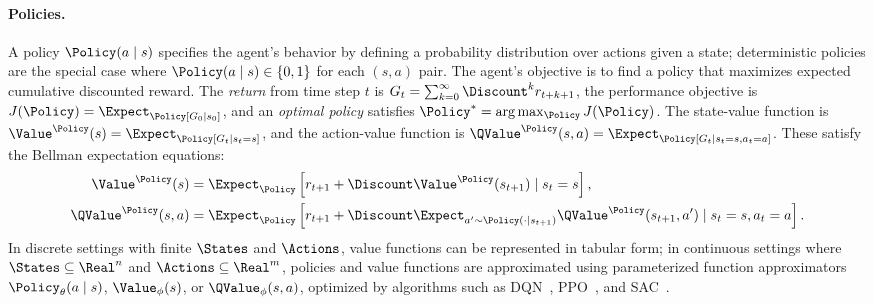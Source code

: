 \paragraph{Policies.}
A policy $\Policy(a \mid s)$ specifies the agent's behavior by defining a probability distribution over actions given a state; deterministic policies are the special case where $\Policy(a \mid s) \in \{0, 1\}$ for each $(s, a)$ pair. The agent's objective is to find a policy that maximizes expected cumulative discounted reward. The \emph{return} from time step $t$ is $G_t = \sum_{k=0}^{\infty} \Discount^k r_{t+k+1}$, the performance objective is $J(\Policy) = \Expect_\Policy[G_0 \mid s_0]$, and an \emph{optimal policy} satisfies $\Policy^* = \arg\max_\Policy J(\Policy)$. The state-value function is $\Value^\Policy(s) = \Expect_\Policy[G_t \mid s_t = s]$, and the action-value function is $\QValue^\Policy(s,a) = \Expect_\Policy[G_t \mid s_t = s, a_t = a]$. These satisfy the Bellman expectation equations:
\begin{align}
\Value^\Policy(s) &= \Expect_\Policy\left[r_{t+1} + \Discount \Value^\Policy(s_{t+1}) \mid s_t = s\right], \\
\QValue^\Policy(s,a) &= \Expect_\Policy\left[r_{t+1} + \Discount \Expect_{a' \sim \Policy(\cdot \mid s_{t+1})} \QValue^\Policy(s_{t+1}, a') \mid s_t = s, a_t = a\right].
\end{align}
In discrete settings with finite $\States$ and $\Actions$, value functions can be represented in tabular form; in continuous settings where $\States \subseteq \Real^n$ and $\Actions \subseteq \Real^m$, policies and value functions are approximated using parameterized function approximators $\Policy_\theta(a \mid s)$, $\Value_\phi(s)$, or $\QValue_\phi(s, a)$, optimized by algorithms such as DQN~\citep{mnih2015human}, PPO~\citep{schulman2017proximal}, and SAC~\citep{haarnoja2018soft}.

